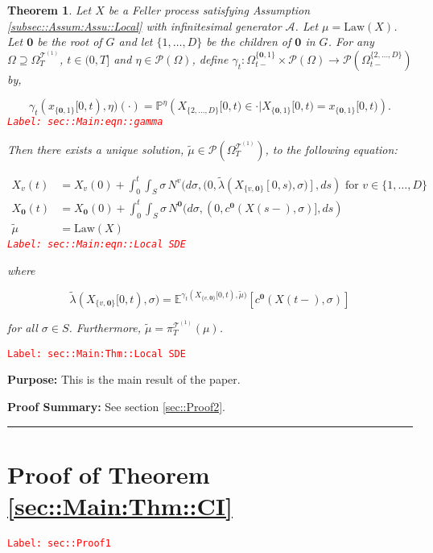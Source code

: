 \documentclass[12pt]{article}
\newcommand{\mb}{\mathbb}
\newcommand{\mc}{\mathcal}
\newcommand{\ra}{\rightarrow}
\newcommand{\te}{\text}
\newcommand{\tr}{\textcolor{red}}
\newcommand{\labe}[1]{\tr{\texttt{Label: #1}}}
\newcommand{\purpose}{\textbf{Purpose: }}
\newcommand{\pfsum}{\textbf{Proof Summary: }}
\newcommand{\lin}{\rule{\linewidth}{0.4 pt}}
\newcommand{\pr}{\mb{P}}							%
\newcommand{\exmu}[2]{\mb{E}^{#1}\left[#2\right]}	%
\newcommand{\pmsr}{\mc{P}}							%
\renewcommand{\root}{\mathbf{0}}				%
\renewcommand{\v}{v}							%
\renewcommand{\S}{S}							%
\newcommand{\s}{\sigma}							%
\newcommand{\T}{T}								%
\newcommand{\x}{x}								%
\renewcommand{\t}{t}							%
\newcommand{\sset}{\Omega}						%
\newcommand{\proj}{\pi}							%
\renewcommand{\tt}{s}							%
\newcommand{\X}{X}								%
\newcommand{\IG}{\mc{A}}						%
\newcommand{\IGr}{c}							%
\newcommand{\vind}[1]{^{#1}}					%
\newcommand{\vsi}[1]{^{#1}}						%
\newcommand{\cind}[1]{_{#1}}					%
\newcommand{\tp}[1]{(#1)}						%
\newcommand{\tip}[1]{#1}						%
\newcommand{\ts}[1]{_{#1}}						%
\newcommand{\degr}{D}							%
\newcommand{\tree}{\mc{T}}						%
\newcommand{\sln}[1]{^{(#1)}}					%
\newcommand{\poiss}{N}							%
\newcommand{\alt}[1]{\widetilde{#1}}			%
\newcommand{\m}{\mu}							%
\newcommand{\mmm}{\eta}							%
\newcommand{\cm}{\gamma}						%
\newcommand{\law}{\te{Law}}						%
\newcommand{\me}[1]{^{#1}}						%
\newcommand{\crate}{\alt{\lambda}}				%
\newtheorem{thms}{Theorem}[section]
\begin{document}
\begin{thms}
Let \(\X\) be a Feller process satisfying Assumption \ref{subsec::Assum:Assu::Local} with infinitesimal generator \(\IG\). Let \(\m = \law(\X)\). Let \(\root\) be the root of \(G\) and let \(\{1,\dots,\degr\}\) be the children of \(\root\) in \(G\). For any \(\sset \supseteq\sset\vsi{\tree\sln{1}}\ts{\T}\), \(\t\in (0,\T]\) and \(\mmm \in \pmsr(\sset)\), define \(\cm\ts{\t}:\sset\vsi{\{\root,1\}}\ts{\t-}\times \pmsr(\sset) \ra \pmsr(\sset\vsi{\{2,\dots,\degr\}}\ts{\t-})\) by,

\begin{equation}
\cm\ts{\t}(\x\cind{\{\root,1\}}\tip{[0,\t)},\mmm)(\cdot) = \pr\me{\mmm}\left(\X\cind{\{2,\dots,\degr\}}\tip{[0,\t)} \in \cdot|\X\cind{\{\root,1\}}\tip{[0,\t)} = \x\cind{\{\root,1\}}\tip{[0,\t)}\right).
\label{sec::Main:eqn::gamma}
\end{equation}
\labe{sec::Main:eqn::gamma}

Then there exists a unique solution, \(\alt{\m} \in \pmsr(\sset\vsi{\tree\sln{1}}\ts{\T})\), to the following equation:

\begin{align}
\X\cind{\v}\tp{\t} &= \X\cind{\v}\tp{0} + \int_0^\t\int_\S \s\,\poiss\vind{\v}(d\s,(0,\crate(\X\cind{\{\v,\root\}}\tip{[0,\tt)},\s)],d\tt) \te{ for } \v \in \{1,\dots,\degr\}\nonumber\\
\X\cind{\root}\tp{\t} &= \X\cind{\root}\tp{0} + \int_0^\t\int_\S \s\,\poiss\vind{\root}(d\s,(0,\IGr\vind{\root}(\X\tp{\tt-},\s)],d\tt)\nonumber\\
\alt{\m} &= \law(\X)
\label{sec::Main:eqn::Local SDE}
\end{align}
\labe{sec::Main:eqn::Local SDE}

where

\[\crate(\X\cind{\{\v,\root\}}\tip{[0,\t)},\s) = \exmu{\cm\ts{\t}(\X\cind{\{\v,\root\}}\tip{[0,\t)},\alt{\m})}{\IGr\vind{\root}(\X\tp{\t-},\s)}\]

for all \(\s\in \S\). Furthermore, \(\alt{\m} = \proj\vsi{\tree\sln{1}}\ts{\T}(\m)\).
\label{sec::Main:Thm::Local SDE}
\end{thms}
\labe{sec::Main:Thm::Local SDE}

\purpose This is the main result of the paper. 

\pfsum See section \ref{sec::Proof2}.

\lin

\section{Proof of Theorem \ref{sec::Main:Thm::CI}}
\label{sec::Proof1}\labe{sec::Proof1}
\end{document}
